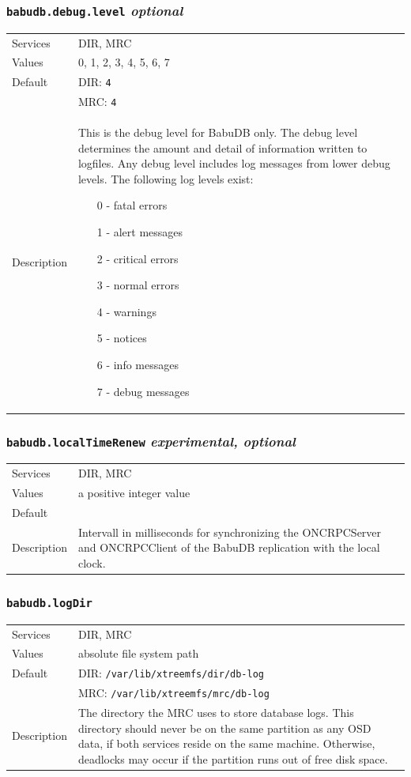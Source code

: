 \documentclass[a4paper,10pt]{book}
\begin{document}
\subsubsection{\texttt{babudb.debug.level} \textit{optional}}
\begin{tabular}{lp{10cm}}
 Services & DIR, MRC\\
 Values   & 0, 1, 2, 3, 4, 5, 6, 7 \\
 Default  & DIR: \texttt{4}\\
		  & MRC: \texttt{4}\\
 Description & This is the debug level for BabuDB only. The debug level determines the amount and detail of information written to logfiles. Any debug level includes log messages from lower debug levels. The following log levels exist:
\begin{enumerate}
 \item[0 -] fatal errors
 \item[1 -] alert messages
 \item[2 -] critical errors
 \item[3 -] normal errors
 \item[4 -] warnings
 \item[5 -] notices
 \item[6 -] info messages
 \item[7 -] debug messages
\end{enumerate}
\end{tabular}

\subsubsection{\texttt{babudb.localTimeRenew} \textit{experimental, optional}}
\begin{tabular}{lp{10cm}}
 Services & DIR, MRC\\
 Values   & a positive integer value\\
 Default  & \\
 Description & Intervall in milliseconds for synchronizing the ONCRPCServer and ONCRPCClient of the BabuDB replication with the local clock. 
\end{tabular}

\subsubsection{\texttt{babudb.logDir}}
\begin{tabular}{lp{10cm}}
 Services & DIR, MRC\\
 Values   & absolute file system path\\
 Default  & DIR: \texttt{/var/lib/xtreemfs/dir/db-log}\\
          & MRC: \texttt{/var/lib/xtreemfs/mrc/db-log}\\
 Description & The directory the MRC uses to store database logs. This directory should never be on the same partition as any OSD data, if both services reside on the same machine. Otherwise, deadlocks may occur if the partition runs out of free disk space.
\end{tabular}
\end{document}

